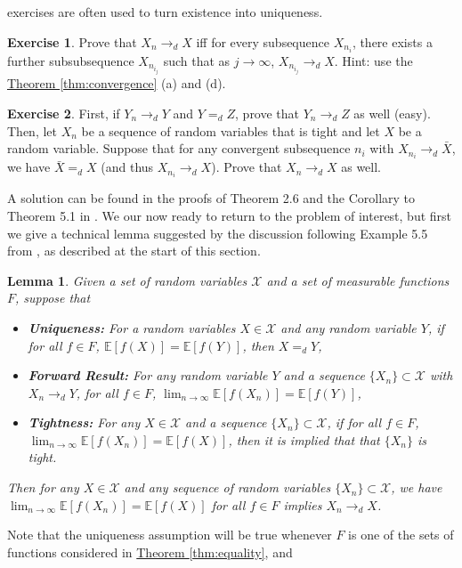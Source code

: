 \documentclass{article}
\newtheorem{lemma}{Lemma}
\theoremstyle{definition}
\newtheorem{exercise}{Exercise}
\newcommand{\E}{\mathbb E}
\newcommand{\1}{\mathbb I}
\newcommand{\thmhref}[1]{\hyperref[#1]{Theorem \ref{#1}}}
\begin{document}
exercises are often used to turn existence into uniqueness.
\begin{exercise}
  Prove that $X_n \to_d X$ iff for every subsequence $X_{n_i}$, there
  exists a further subsubsequence $X_{n_{i_j}}$ such that as $j \to
  \infty$, $X_{n_{i_j}} \to_d X$.  Hint: use the
  \thmhref{thm:convergence} (a) and (d).
\end{exercise}
\begin{exercise}
  \label{ex:limit}
  First, if $Y_n \to_d Y$ and $Y =_d Z$, prove that $Y_n \to_d Z$ as
  well (easy).  Then, let $X_n$ be a sequence of random variables that
  is tight and let $X$ be a random variable.  Suppose that for any
  convergent subsequence $n_i$ with $X_{n_i} \to_d \bar X$, we have
  $\bar X =_d X$ (and thus $X_{n_i} \to_d X$).  Prove that $X_n \to_d
  X$ as well.
\end{exercise}
A solution can be found in the proofs of Theorem 2.6 and the Corollary
to Theorem 5.1 in \cite{billingsley2009convergence}.  We our now ready
to return to the problem of interest, but first we give a technical
lemma suggested by the discussion following Example 5.5 from
\cite{billingsley2009convergence}, as described at the start of this
section.
\begin{lemma}
  \label{lem:tech}
  Given a set of random variables $\mathcal X$ and a set of measurable functions $F$,
  suppose that
  \begin{itemize}
  \item {\bf Uniqueness:} For a random variables $X \in \mathcal X$ and any random variable $Y$, if for all $f \in F$, $\E[f(X)] =\E[f(Y)]$, then $X =_d Y$,
  \item {\bf Forward Result:} For any random variable $Y$ and a
    sequence $\{X_n\}\subset \mathcal X$ with $X_n \to_d Y$, for all
    $f \in F$, $\lim_{n \to \infty} \E[f(X_n)] = \E[f(Y)]$,
  \item {\bf Tightness:} For any $X \in \mathcal X$ and a sequence
    $\{X_n\} \subset \mathcal X$, if for all $f \in F$, $\lim_{n \to
      \infty} \E[f(X_n)] = \E[f(X)]$, then it is implied that that
    $\{X_n\}$ is tight.
  \end{itemize}
  Then for any $X \in \mathcal X$ and any sequence of random variables
  $\{X_n\}\subset \mathcal X$, we have $\lim_{n \to \infty} \E[f(X_n)]
  = \E[f(X)]$ for all $f \in F$ implies $X_n \to_d X$.
\end{lemma}
Note that the uniqueness assumption will be true whenever $F$ is one
of the sets of functions considered in \thmhref{thm:equality}, and
\end{document}
